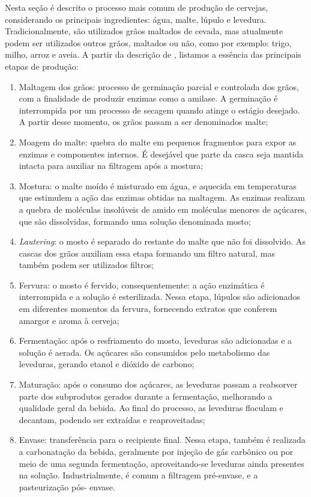 Nesta seção é descrito o processo mais comum de produção de cervejas, considerando os principais
ingredientes: água, malte, lúpulo e levedura. Tradicionalmente, são utilizados grãos maltados de cevada,
mas atualmente podem ser utilizados outros grãos, maltados ou não, como por exemplo: trigo, milho, arroz e aveia.
A partir da descrição de , listamos a essência das principais etapas de produção:


\begin{enumerate}
    \item Maltagem dos grãos: processo de germinação parcial e controlada dos grãos, com a finalidade
de produzir enzimas como a amilase. A germinação é interrompida por um processo de secagem quando atinge o estágio desejado.
A partir desse momento, os grãos passam a ser denominados malte;
    \item Moagem do malte: quebra do malte em pequenos fragmentos para expor as enzimas e componentes internos. É desejável
que parte da casca seja mantida intacta para auxiliar na filtragem após a mostura;
    \item Mostura: o malte moído é misturado em água, e aquecida em temperaturas
que estimulem a ação das enzimas obtidas na maltagem. As enzimas
realizam a quebra de moléculas insolúveis de amido em moléculas menores
de açúcares, que são dissolvidas, formando uma solução denominada mosto;
    \item \textit{Lautering}: o mosto é separado do restante do malte que não foi dissolvido. As
cascas dos grãos auxiliam essa etapa formando um filtro natural, mas também podem ser utilizados filtros;
    \item Fervura: o mosto é fervido, consequentemente: a ação enzimática é
interrompida e a solução é esterilizada. Nessa etapa, lúpulos são adicionados em diferentes
momentos da fervura, fornecendo extratos que conferem amargor e aroma à cerveja;
    \item Fermentação: após o resfriamento do mosto, leveduras são adicionadas e a solução é aerada. 
Os açúcares são consumidos pelo metabolismo das leveduras, gerando etanol e dióxido de carbono;
    \item Maturação: após o consumo dos açúcares, as leveduras passam a reabsorver parte dos
subprodutos gerados durante a fermentação, melhorando a qualidade geral da bebida. Ao final do processo, as leveduras floculam e decantam, podendo ser extraídas e reaproveitadas;
    \item Envase: transferência para o recipiente final. Nessa etapa, também é
realizada a carbonatação da bebida, geralmente por injeção de gás carbônico
ou por meio de uma segunda fermentação, aproveitando-se leveduras ainda presentes na solução.
Industrialmente, é comum a filtragem pré-envase, e a pasteurização pós-
envase.
\end{enumerate}

